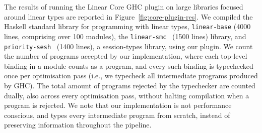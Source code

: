 \documentclass[acmsmall,review,screen]{acmart}
\begin{document}
%
%
%
%


The results of running the Linear Core GHC plugin on large 
libraries focused around linear types are reported in
Figure~\ref{fig:core-plugin-res}.
%
%
We compiled the Haskell standard library for programming with linear types,
\texttt{linear-base} (4000 lines, comprising over 100 modules), the
\texttt{linear-smc}~\cite{10.1145/3471874.3472980} (1500 lines) library, and
\texttt{priority-sesh}~\cite{10.1145/3471874.3472979} (1400 lines), a
session-types library, using our plugin.
%
We count the number of programs accepted by our implementation, where
each top-level binding in a module counts as a program, and every such
binding is typechecked once per optimisation pass (i.e., we typecheck
all intermediate programs produced by GHC). The total amount of programs
rejected by the typechecker are counted dually, also across every optimisation
pass, without halting compilation when a program is rejected. We note that our
implementation is not performance conscious, and types every intermediate
program from scratch, instead of preserving information throughout the
pipeline.
\end{document}
